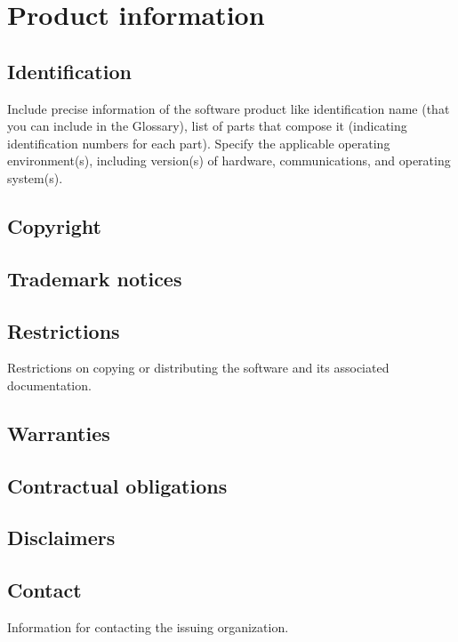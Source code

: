 \chapter{Product information}
\vspace{-6em}


\section{Identification}
Include precise information of the software product like identification name (that you can include in the \gls{Glossary}), list of parts that compose it (indicating identification numbers for each part). 
Specify the applicable operating environment(s), including version(s) of hardware, communications, and operating system(s).

\section{Copyright}

\section{Trademark notices}

\section{Restrictions}
Restrictions on copying or distributing the software and its associated
documentation.

\section{Warranties}

\section{Contractual obligations}

\section{Disclaimers}

\section{Contact}
Information for contacting the issuing organization.